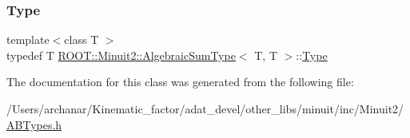 \mbox{\label{classROOT_1_1Minuit2_1_1AlgebraicSumType_3_01T_00_01T_01_4_a840029212ccc1ff6fce3aeb7ec3187de}} 
\subsubsection{\texorpdfstring{Type}{Type}\hspace{0.1cm}{\footnotesize\ttfamily [2/2]}}
{\footnotesize\ttfamily template$<$class T $>$ \\
typedef T \mbox{\hyperlink{classROOT_1_1Minuit2_1_1AlgebraicSumType}{R\+O\+O\+T\+::\+Minuit2\+::\+Algebraic\+Sum\+Type}}$<$ T, T $>$\+::\mbox{\hyperlink{classROOT_1_1Minuit2_1_1AlgebraicSumType_3_01T_00_01T_01_4_a840029212ccc1ff6fce3aeb7ec3187de}{Type}}}



The documentation for this class was generated from the following file\+:\begin{DoxyCompactItemize}
\item 
/\+Users/archanar/\+Kinematic\+\_\+factor/adat\+\_\+devel/other\+\_\+libs/minuit/inc/\+Minuit2/\mbox{\hyperlink{other__libs_2minuit_2inc_2Minuit2_2ABTypes_8h}{A\+B\+Types.\+h}}\end{DoxyCompactItemize}
